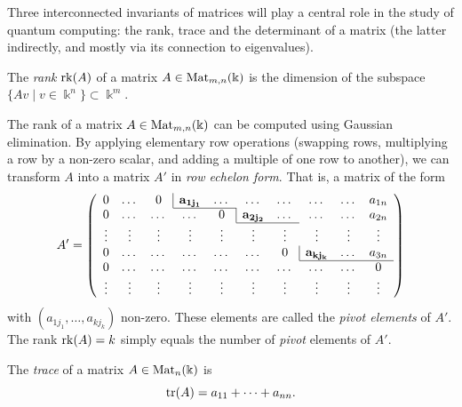 \documentclass[a4paper, oneside, 12pt]{amsart}
\begin{document}
Three interconnected invariants of matrices will play a central role in the study of quantum computing: the rank, trace and the determinant of a matrix (the latter indirectly, and mostly via its connection to eigenvalues).

\begin{definition}\label{def:rank}
  The \emph{rank} \(\operatorname{rk}(A)\) of a matrix \(A \in \operatorname{Mat}_{m,n}(\Bbbk)\) is the dimension of the subspace \(\{ Av \mid v\in \Bbbk^{n}\}\subset \Bbbk^{m}\).
\end{definition}

The rank of a matrix \( A \in \operatorname{Mat}_{m,n}(\Bbbk) \) can be computed using Gaussian elimination.
By applying elementary row operations (swapping rows, multiplying a row by a non-zero scalar, and adding a multiple of one row to another), we can transform \( A \) into a matrix \(A'\) in  \emph{row echelon form}.
That is, a matrix of the form
\begin{equation*}
  A' = \left(
    \begin{array}{cccccccccc}
      0 & \dots & 0 &\multicolumn{1}{|c}{\mathbf{a_{1j_{1}}}} & \dots  & \dots& \dots & \dots & \dots  & a_{1n} \\
      \cline{4-5}
      0 & \dots & \dots & \dots & 0 &  \multicolumn{1}{|c}{\mathbf{a_{2j_{2}}}} & \dots & \dots & \dots & a_{2n} \\
      \cline{6-7}
      \vdots & \vdots & \vdots & \vdots & \vdots & \vdots & \vdots & \vdots & \vdots  & \vdots\\
      0 & \dots & \dots & \dots & \dots & \dots &  0 & \multicolumn{1}{|c}{\mathbf{a_{kj_{k}}}} &\dots &  a_{3n} \\
      \cline{8-10}
      0 & \dots & \dots & \dots  & \dots & \dots & \dots & \dots & \dots & 0\\
      \vdots & \vdots & \vdots & \vdots & \vdots & \vdots & \vdots & \vdots & \vdots  & \vdots\\
    \end{array}
  \right)
\end{equation*}
with \((a_{1j_{1}}, \dots , a_{kj_{k}})\)  non-zero.
These elements are called the \emph{pivot elements} of \(A'\).
The rank \(\operatorname{rk} (A) = k\) simply equals the number of \emph{pivot} elements of \(A'\).


\begin{definition}\label{def:trace}
  The \emph{trace} of a matrix \(A\in \operatorname{Mat}_{n}( \Bbbk)\) is
  \begin{equation}
    \operatorname{tr}(A)= a_{11}+ \dots + a_{nn}.
  \end{equation}
\end{definition}
\end{document}
